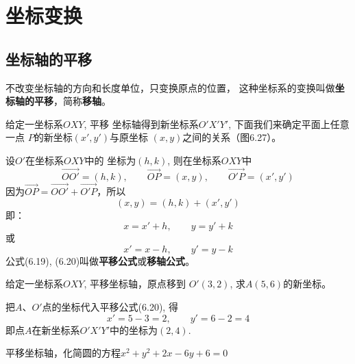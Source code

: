 \section{坐标变换}
\subsection{坐标轴的平移}
不改变坐标轴的方向和长度单位，只变换原点的位置，
这种坐标系的变换叫做\textbf{坐标轴的平移}，简称\textbf{移轴}。

给定一坐标系$OXY$, 平移
坐标轴得到新坐标系$O'X'Y'$, 
下面我们来确定平面上任意一点
$P$的新坐标$(x',y')$与原坐标
$(x,y)$之间的关系（图6.27）。

\begin{figure}[htp]
    \centering
{}
    \caption{}
\end{figure}

设$O'$在坐标系$OXY$中的
坐标为$(h,k)$, 则在坐标系$OXY$中
\[\Vec{OO'}=(h,k),\qquad \Vec{OP}=(x,y),\qquad \Vec{O'P}=(x',y')\]
因为$\Vec{OP}=\Vec{OO'}+\Vec{O'P}$，所以
\[(x,y)=(h,k)+(x',y')\]
即：
\begin{equation}
    x=x'+h,\qquad y=y'+k
\end{equation}
或
\begin{equation}
    x'=x-h,\qquad y'=y-k
\end{equation}
公式(6.19), (6.20)叫做\textbf{平移公式}或\textbf{移轴公式}。


\begin{example}
    给定一坐标系$OXY$, 平移坐标轴，原点移到
    $O'(3,2)$, 求$A(5,6)$的新坐标。
\end{example}

\begin{solution}
把$A$、$O'$点的坐标代入平移公式(6.20), 得
    \[x'=5-3=2,\qquad y'=6-2=4\]
    即点$A$在新坐标系$O'X'Y'$中的坐标为$(2,4)$.     
\end{solution}



\begin{example}
    平移坐标轴，化简圆的方程$x^2+y^2+2x-6y+6=0$
\end{example}

